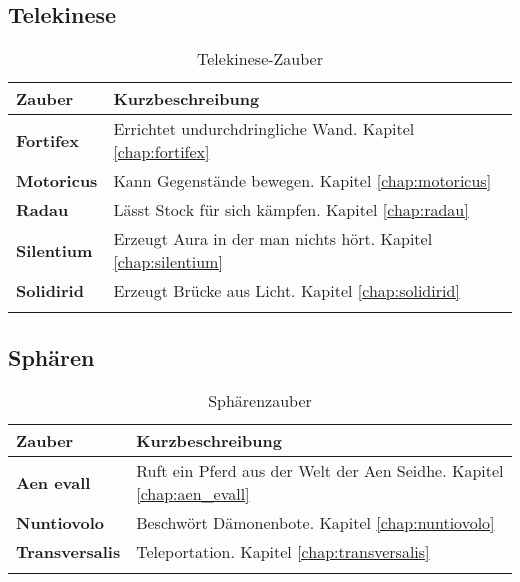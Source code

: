 \subsection{Telekinese}
\begin{longtable}{|p{5cm}|p{10cm}|}
\hline
\textbf{Zauber} & \textbf{Kurzbeschreibung} \\ \hline

\textbf{Fortifex} & Errichtet undurchdringliche Wand. Kapitel \ref{chap:fortifex} \\ \hline

\textbf{Motoricus} & Kann Gegenstände bewegen. Kapitel \ref{chap:motoricus} \\ \hline

\textbf{Radau} & Lässt Stock für sich kämpfen. Kapitel \ref{chap:radau} \\ \hline

\textbf{Silentium} & Erzeugt Aura in der man nichts hört. Kapitel \ref{chap:silentium} \\ \hline

\textbf{Solidirid} & Erzeugt Brücke aus Licht. Kapitel \ref{chap:solidirid} \\ \hline

\caption{Telekinese-Zauber}
\label{tab:telekinese-zauber}
\end{longtable}


\subsection{Sphären}
\begin{longtable}{|p{5cm}|p{10cm}|}
\hline
\textbf{Zauber} & \textbf{Kurzbeschreibung} \\ \hline

\textbf{Aen evall} & Ruft ein Pferd aus der Welt der Aen Seidhe. Kapitel \ref{chap:aen_evall} \\ \hline

\textbf{Nuntiovolo} & Beschwört Dämonenbote. Kapitel \ref{chap:nuntiovolo} \\ \hline

\textbf{Transversalis} & Teleportation. Kapitel \ref{chap:transversalis} \\ \hline

\caption{Sphärenzauber}
\label{tab:sphaerenzauber}
\end{longtable}


